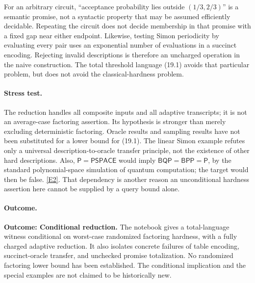 \documentclass[11pt,a4paper]{article}
\newcommand{\eref}[2]{\hyperlink{extra:#1:#2}{[E#2]}}
\begin{document}
For an arbitrary circuit, ``acceptance probability lies outside
$(1/3,2/3)$'' is a semantic promise, not a syntactic property that may be
assumed efficiently decidable. Repeating the circuit does not decide
membership in that promise with a fixed gap near either endpoint.
Likewise, testing Simon periodicity by evaluating every pair uses an
exponential number of evaluations in a succinct encoding. Rejecting
invalid descriptions is therefore an uncharged operation in the naive
construction. The total threshold language (19.1) avoids that particular
problem, but does not avoid the classical-hardness problem.

\paragraph{Stress test.}
The reduction handles all composite inputs and all adaptive transcripts;
it is not an average-case factoring assertion. Its hypothesis is stronger
than merely excluding deterministic factoring. Oracle results and sampling
results have not been substituted for a lower bound for (19.1). The
linear Simon example refutes only a universal description-to-oracle
transfer principle, not the existence of other hard descriptions.
Also, $\mathsf P=\mathsf{PSPACE}$ would imply
$\mathsf{BQP}=\mathsf{BPP}=\mathsf P$, by the standard polynomial-space
simulation of quantum computation; the target would then be false.
\eref{statement}{2}. That dependency is another reason an unconditional
hardness assertion here cannot be supplied by a query bound alone.

\paragraph{Outcome.}
\textbf{Outcome: Conditional reduction.}
The notebook gives a total-language witness conditional on worst-case
randomized factoring hardness, with a fully charged adaptive reduction.
It also isolates concrete failures of table encoding, succinct-oracle
transfer, and unchecked promise totalization. No randomized factoring
lower bound has been established. The conditional implication and the
special examples are not claimed to be historically new.
\end{document}

